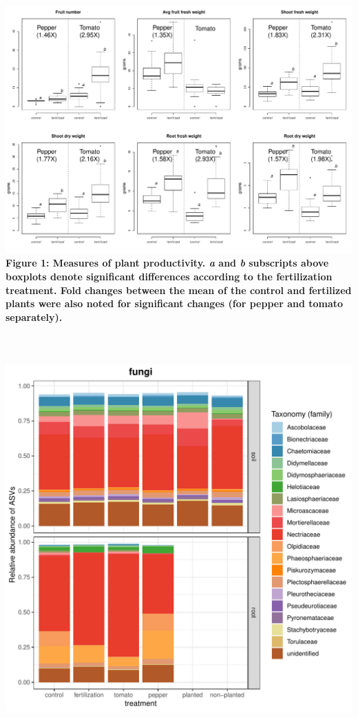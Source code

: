 \documentclass[11pt,]{article}
\begin{document}
\includegraphics[width=6.25000in]{../figures/Figure_3_productivity.pdf}\\
\textbf{Figure 1: Measures of plant productivity. \emph{a} and \emph{b}
subscripts above boxplots denote significant differences according to
the fertilization treatment. Fold changes between the mean of the
control and fertilized plants were also noted for significant changes
(for pepper and tomato separately).}\\
\hspace*{0.333em}\\
\hspace*{0.333em}\\
\hspace*{0.333em}\\
\includegraphics[width=7.29167in]{../figures/Figure4_FAMILY_barplots_fungi.pdf}\\
\end{document}
